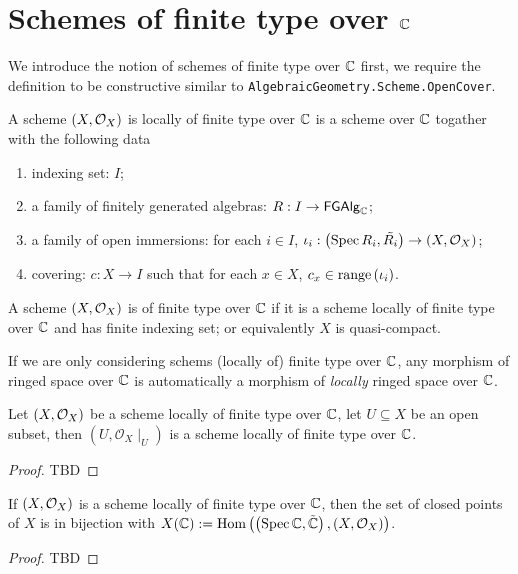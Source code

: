 \chapter{Schemes of finite type over $\mathbb{C}$}

We introduce the notion of schemes of finite type over $\mathbb{C}$ first, we require the definition to be constructive similar
to {\tt AlgebraicGeometry.Scheme.OpenCover}.

\begin{definition}
  \label{def:SchemeLocallyOfFiniteType}
  A scheme $\left(X, \mathcal{O}_{X}\right)$ is locally of finite type over $\mathbb{C}$ is a scheme over $\mathbb{C}$ togather
  with the following data
    \begin{enumerate}
        \item indexing set: $I$;
        \item a family of finitely generated algebras: $R : I \to \mathsf{FGAlg}_{\mathbb{C}}$;
        \item a family of open immersions: for each $i \in I$, $\iota_i: \left(\operatorname*{Spec}{R_i}, \tilde{R_i}\right) \to \left(X, \mathcal{O}_{X}\right)$;
        \item covering: $c : X \to I$ such that for each $x \in X$, $c_x \in \operatorname*{range}\left({\iota_i}\right)$.
    \end{enumerate}
\end{definition}


\begin{definition}
  \label{def:SchemeOfFiniteType}
  A scheme $\left(X, \mathcal{O}_{X}\right)$ is of finite type over $\mathbb{C}$ if it is a scheme locally of finite type over $\mathbb{C}$
  and has finite indexing set; or equivalently $X$ is quasi-compact.
\end{definition}

\begin{remark}
  If we are only considering schems (locally of) finite type over $\mathbb{C}$, any morphism of ringed space over $\mathbb{C}$ is automatically a morphism of {\em locally} ringed space over $\mathbb{C}$.
\end{remark}


\begin{proposition}
  Let $\left(X, \mathcal{O}_{X}\right)$ be a scheme locally of finite type over $\mathbb{C}$, let $U \subseteq X$ be an open subset, then $(U, \mathcal{O}_{X}\mid_{U})$ is a scheme locally of finite type over $\mathbb{C}$.
\end{proposition}
\begin{proof}
TBD
\end{proof}


\begin{proposition}
  If $\left(X, \mathcal{O}_{X}\right)$ is a scheme locally of finite type over $\mathbb{C}$, then the set of closed points of $X$ is in bijection with $X(\mathbb{C}) := \operatorname{Hom}\left(\left(\operatorname*{Spec}{\mathbb{C}}, \tilde{\mathbb{C}}\right), \left(X, \mathcal{O}_{X}\right)\right)$.
\end{proposition}
\begin{proof}
  TBD
\end{proof}
